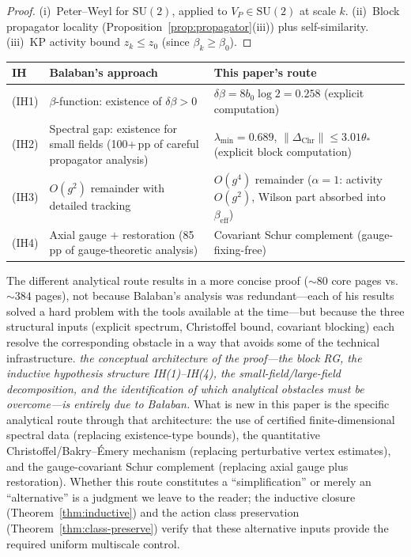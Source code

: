 \documentclass[11pt]{article}
\theoremstyle{definition}
\newcommand{\SU}{\mathrm{SU}}
\begin{document}
\begin{proof}
(i)~Peter--Weyl for $\SU(2)$, applied to $V_P\in\SU(2)$
at scale $k$.  (ii)~Block propagator locality
(Proposition~\ref{prop:propagator}(iii)) plus self-similarity.
(iii)~KP activity bound $z_k\le z_0$ (since $\beta_k\ge\beta_0$).
\end{proof}

\begin{center}
\begin{tabular}{lp{5cm}p{5cm}}
\toprule
\textbf{IH} & \textbf{Balaban's approach} & \textbf{This paper's route}\\
\midrule
(IH1) & $\beta$-function: existence of $\delta\beta>0$ &
$\delta\beta=8b_0\log 2=0.258$ (explicit computation)\\
(IH2) & Spectral gap: existence for small fields (100+\,pp of
careful propagator analysis) &
$\lambda_{\min}=0.689$, $\|\Delta_{\mathrm{Chr}}\|\le 3.01\theta_*$
(explicit block computation)\\
(IH3) & $O(g^2)$ remainder with detailed tracking &
$O(g^4)$ remainder ($\alpha=1$: activity $O(g^2)$, Wilson part absorbed into $\beta_{\mathrm{eff}}$)\\
(IH4) & Axial gauge $+$ restoration (85\,pp of
gauge-theoretic analysis) &
Covariant Schur complement (gauge-fixing-free)\\
\bottomrule
\end{tabular}
\end{center}

The different analytical route results in a more concise proof (${\sim}80$
core pages vs.\ ${\sim}384$ pages), not because Balaban's analysis
was redundant---each of his results solved a hard problem with the
tools available at the time---but because the three structural inputs
(explicit spectrum, Christoffel bound, covariant blocking) each
resolve the corresponding obstacle in a way that avoids some of the
technical infrastructure.  \emph{the conceptual
architecture of the proof---the block RG, the inductive hypothesis
structure IH(1)--IH(4), the small-field/large-field decomposition,
and the identification of which analytical obstacles must be
overcome---is entirely due to Ba\l aban.}
What is new in this paper is the specific analytical route through
that architecture: the use of certified finite-dimensional spectral
data (replacing existence-type bounds), the quantitative
Christoffel/Bakry--\'Emery mechanism (replacing perturbative
vertex estimates), and the gauge-covariant Schur complement
(replacing axial gauge plus restoration).  Whether this route
constitutes a ``simplification'' or merely an ``alternative''
is a judgment we leave to the reader; the inductive closure
(Theorem~\ref{thm:inductive}) and the action class preservation
(Theorem~\ref{thm:class-preserve}) verify that these alternative
inputs provide the required uniform multiscale control.
\end{document}

